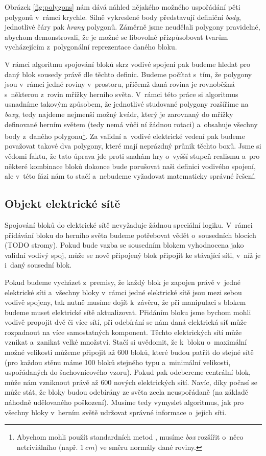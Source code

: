 \FloatBarrier

Obrázek \ref{fig:polygons} nám dává náhled nějakého možného uspořádání pěti polygonů v~rámci krychle. Silně vykreslené body představují definiční \textit{body}, jednotlivé čáry pak \textit{hrany} polygonů. Záměrně jsme neudělali polygony pravidelné, abychom demonstrovali, že je možné se libovolně přizpůsobovat tvarům vycházejícím z~polygonální reprezentace daného bloku.


V rámci algoritmu spojování bloků skrz vodivé spojení pak budeme hledat pro daný blok sousedy právě dle těchto definic. Budeme počítat s~tím, že polygony jsou v~rámci jedné roviny v~prostoru, přičemž daná rovina je rovnoběžná s~některou z~rovin mřížky herního světa. V~rámci této práce si algoritmus usnadníme takovým způsobem, že jednotlivé studované polygony rozšíříme na \textit{boxy}, tedy najdeme nejmenší možný kvádr, který je zarovnaný do mřížky definované herním světem (tedy nemá vůči ní žádnou rotaci) a~obsahuje všechny body z~daného polygonu\footnote{Abychom mohli použít standardních metod , musíme \textit{box} rozšířit o~něco netriviálního (např. $1~cm$) ve směru normály dané roviny.}. Za validní a~vodivé elektrické vedení pak budeme považovat takové dva polygony, které mají neprázdný průnik těchto boxů. Jsme si vědomi faktu, že tato úprava jde proti snahám hry o~vyšší stupeň realismu a~pro některé kombinace bloků dokonce bude porušovat naši definici vodivého spojení, ale v~této fázi nám to stačí a~nebudeme vyžadovat matematicky správné řešení.


\subsection{Objekt elektrické sítě}

Spojování bloků do elektrické sítě nevyžaduje žádnou speciální logiku. V~rámci přidávání bloku do herního světa budeme potřebovat vědět o~sousedních blocích (TODO stromy). Pokud bude vazba se sousedním blokem vyhodnocena jako validní vodivý spoj, může se nově připojený blok připojit ke stávající síti, v~níž je i~daný sousední blok.

Pokud budeme vycházet z~premisy, že každý blok je zapojen právě v~jedné elektrické síti a~všechny bloky v~rámci jedné elektrické sítě jsou mezi sebou vodivě spojeny, tak nutně musíme dojít k~závěru, že při manipulaci s blokem budeme muset elektrické sítě aktualizovat. Přidáním bloku jsme bychom mohli vodivě propojit dvě či více sítí, při odebírání se nám daná elektrická síť může rozpadnout na více samostatných komponent. Těchto elektrických sítí může vznikat a~zanikat velké množství. Stačí si uvědomit, že k~bloku  o~maximální možné velikosti můžeme připojit až 600 bloků, které budou patřit do stejné sítě (pro každou stěnu máme 100 bloků stejného typu a~minimální velikosti, uspořádaných do šachovnicového vzoru). Pokud pak odebereme centrální blok, může nám vzniknout právě až 600 nových elektrických sítí. Navíc, díky počasí se může stát, že bloky budou odebírány ze světa zcela neuspořádaně (na základě náhodně udělovaného poškození). Musíme tedy vymyslet algoritmus, jak pro všechny bloky v~herním světě udržovat správné informace o~jejich síti.

